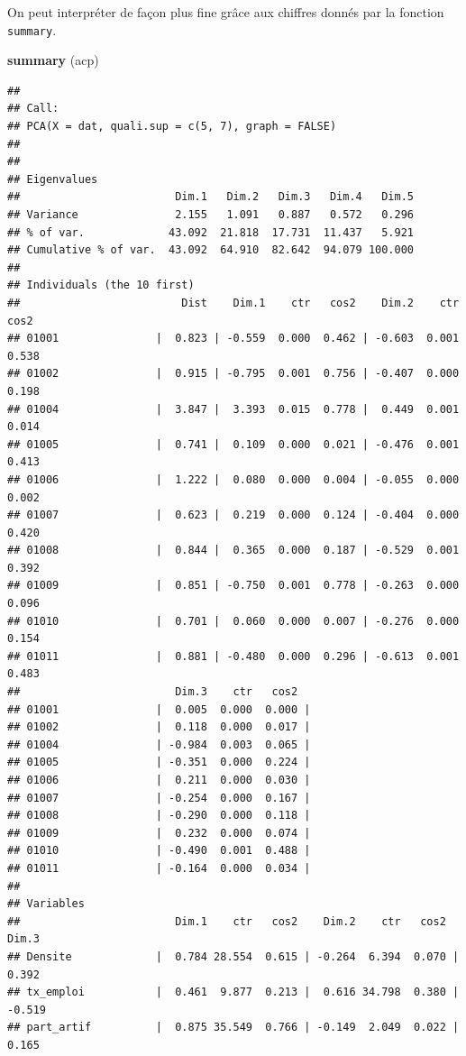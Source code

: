 \documentclass[]{book}
\newenvironment{Shaded}{\begin{snugshade}}{\end{snugshade}}
\newcommand{\KeywordTok}[1]{\textcolor[rgb]{0.13,0.29,0.53}{\textbf{#1}}}
\newcommand{\NormalTok}[1]{#1}
\begin{document}
On peut interpréter de façon plus fine grâce aux chiffres donnés par la fonction \texttt{summary}.

\begin{Shaded}
\begin{Highlighting}[]
\KeywordTok{summary}\NormalTok{ (acp)}
\end{Highlighting}
\end{Shaded}

\begin{verbatim}
## 
## Call:
## PCA(X = dat, quali.sup = c(5, 7), graph = FALSE) 
## 
## 
## Eigenvalues
##                        Dim.1   Dim.2   Dim.3   Dim.4   Dim.5
## Variance               2.155   1.091   0.887   0.572   0.296
## % of var.             43.092  21.818  17.731  11.437   5.921
## Cumulative % of var.  43.092  64.910  82.642  94.079 100.000
## 
## Individuals (the 10 first)
##                         Dist    Dim.1    ctr   cos2    Dim.2    ctr   cos2
## 01001               |  0.823 | -0.559  0.000  0.462 | -0.603  0.001  0.538
## 01002               |  0.915 | -0.795  0.001  0.756 | -0.407  0.000  0.198
## 01004               |  3.847 |  3.393  0.015  0.778 |  0.449  0.001  0.014
## 01005               |  0.741 |  0.109  0.000  0.021 | -0.476  0.001  0.413
## 01006               |  1.222 |  0.080  0.000  0.004 | -0.055  0.000  0.002
## 01007               |  0.623 |  0.219  0.000  0.124 | -0.404  0.000  0.420
## 01008               |  0.844 |  0.365  0.000  0.187 | -0.529  0.001  0.392
## 01009               |  0.851 | -0.750  0.001  0.778 | -0.263  0.000  0.096
## 01010               |  0.701 |  0.060  0.000  0.007 | -0.276  0.000  0.154
## 01011               |  0.881 | -0.480  0.000  0.296 | -0.613  0.001  0.483
##                        Dim.3    ctr   cos2  
## 01001               |  0.005  0.000  0.000 |
## 01002               |  0.118  0.000  0.017 |
## 01004               | -0.984  0.003  0.065 |
## 01005               | -0.351  0.000  0.224 |
## 01006               |  0.211  0.000  0.030 |
## 01007               | -0.254  0.000  0.167 |
## 01008               | -0.290  0.000  0.118 |
## 01009               |  0.232  0.000  0.074 |
## 01010               | -0.490  0.001  0.488 |
## 01011               | -0.164  0.000  0.034 |
## 
## Variables
##                        Dim.1    ctr   cos2    Dim.2    ctr   cos2    Dim.3
## Densite             |  0.784 28.554  0.615 | -0.264  6.394  0.070 |  0.392
## tx_emploi           |  0.461  9.877  0.213 |  0.616 34.798  0.380 | -0.519
## part_artif          |  0.875 35.549  0.766 | -0.149  2.049  0.022 |  0.165

\end{verbatim}
\end{document}

